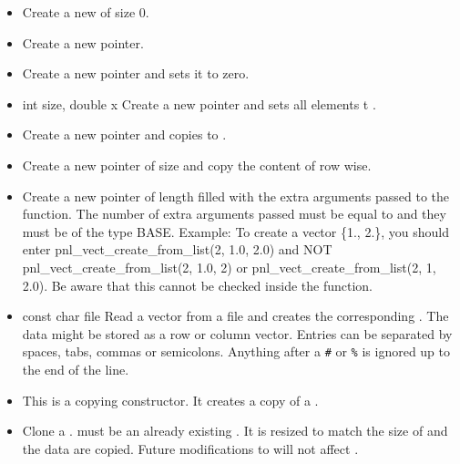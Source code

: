 \begin{itemize}
  \item {}
  \sshortdescribe Create a new \PnlVect of size 0.  
\item {}
  \sshortdescribe Create a new \PnlVect pointer.  
\item {}
  \sshortdescribe Create a new \PnlVect pointer and sets it to zero.  
\item {}
  {int size, double x}
  \sshortdescribe Create a new \PnlVect pointer and sets all
  elements t .  
\item {}
  \sshortdescribe Create a new \PnlVect pointer and copies 
  to .  
\item {}
  \sshortdescribe Create a new \PnlVect pointer of size 
  and copy the content of  row wise.
\item {}
  \sshortdescribe Create a new \PnlVect pointer of length
   filled with the extra arguments passed to the function. The
  number of extra arguments passed must be equal to  and they must be of the type BASE.
  Example: To create a vector \{1., 2.\}, you should enter pnl_vect_create_from_list(2, 1.0, 2.0) and NOT pnl_vect_create_from_list(2, 1.0, 2) or pnl_vect_create_from_list(2, 1, 2.0).
  Be aware that this cannot be checked inside the function.
\item {}
  {const char \ptr file}
  \sshortdescribe Read a vector from a file and creates the corresponding
  \PnlVect. The data might be stored as a row or column vector. Entries can be separated by spaces, tabs, commas or semicolons. Anything after a \verb!#! or \verb!%! is ignored up to the end of the line.

\item {}
  \sshortdescribe This is a copying constructor. It creates a copy of a \PnlVect.
\item {} 
  \sshortdescribe Clone a \PnlVect.  must be an
  already existing  \PnlVect. It is resized to match the size of
   and the data are copied. Future modifications to  will not
  affect .


\end{itemize}
